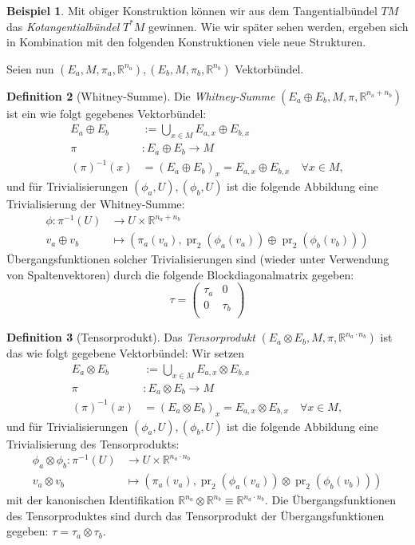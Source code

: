 \documentclass[a4paper]{scrbook}
\numberwithin{equation}{chapter}
\DeclareMathOperator{\pr}{pr}
\newcommand{\R}{\mathbb{R}}
\theoremstyle{definition}
\newtheorem{defn}{Definition}[section]
\newtheorem{bsp}[defn]{Beispiel}
\begin{document}
		\begin{bsp}
			Mit obiger Konstruktion können wir aus dem Tangentialbündel $TM$ das \emph{Kotangentialbündel} $T^*M$ gewinnen. Wie wir später sehen werden, ergeben sich in Kombination mit den folgenden Konstruktionen viele neue Strukturen.
		\end{bsp}
		
		Seien nun $(E_a,M,\pi_a,\R^{n_a}),(E_b,M,\pi_b,\R^{n_b})$ Vektorbündel.
		\begin{defn}[Whitney-Summe]
			Die \emph{Whitney-Summe} $(E_a\oplus E_b ,M,\pi,\R^{n_a+n_b})$ ist ein wie folgt gegebenes Vektorbündel:
			\begin{align*}
				E_a\oplus E_b&:=\bigcup_{x\in M}E_{a,x}\oplus E_{b,x}\\
				\pi&\colon E_a\oplus E_b\rightarrow M\\
				(\pi)^{-1}(x)&=(E_a\oplus E_b)_x=E_{a,x}\oplus E_{b,x}\quad \forall x\in M,
			\end{align*}
			und für Trivialisierungen $(\phi_a,U),(\phi_b,U)$ ist die folgende Abbildung eine Trivialisierung der Whitney-Summe:
			\begin{align*}
				\phi\colon\pi^{-1}(U)&\rightarrow U\times \R^{n_a+n_b}\\
				v_a\oplus v_b&\mapsto (\pi_a(v_a), \pr_2(\phi_a(v_a))\oplus\pr_2(\phi_b(v_b)))
			\end{align*}
			Übergangsfunktionen solcher Trivialisierungen sind (wieder unter Verwendung von Spaltenvektoren) durch die folgende Blockdiagonalmatrix gegeben: 
			\begin{equation}
				\tau=\left(\begin{array}{cc}\tau_a&0\\0&\tau_b\\ \end{array}\right)
			\end{equation}
		\end{defn}
		\begin{defn}[Tensorprodukt]
			Das \emph{Tensorprodukt} $(E_a\otimes E_b, M, \pi, \R^{n_a\cdot n_b})$ ist das wie folgt gegebene Vektorbündel: Wir setzen
			\begin{align*}
				E_a\otimes E_b&:=\bigcup_{x\in M}E_{a,x}\otimes E_{b,x}\\
				\pi&\colon E_a\otimes E_b\rightarrow M\\
				(\pi)^{-1}(x)&=(E_a\otimes E_b)_x=E_{a,x}\otimes E_{b,x}\quad \forall x\in M,
			\end{align*}
			und für Trivialisierungen $(\phi_a,U),(\phi_b,U)$ ist die folgende Abbildung eine Trivialisierung des Tensorprodukts:
			\begin{align*}
				\phi_a\otimes\phi_b\colon\pi^{-1}(U)&\rightarrow U\times \R^{n_a\cdot n_b}\\
				v_a\otimes v_b&\mapsto (\pi_a(v_a), \pr_2(\phi_a(v_a))\otimes\pr_2(\phi_b(v_b)))
			\end{align*}
			mit der kanonischen Identifikation  $\R^{n_a} \otimes\R^{n_b} \equiv \R^{n_a \cdot n_b}$.
			Die Übergangsfunktionen des Tensorproduktes sind durch das Tensorprodukt der Übergangsfunktionen gegeben: $\tau=\tau_a\otimes\tau_b$.
		\end{defn}
		
\end{document}
